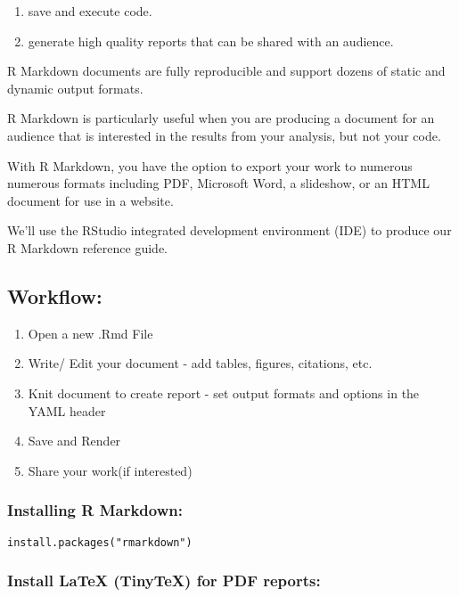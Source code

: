 \documentclass[
]{article}
\providecommand{\tightlist}{%
  \setlength{\itemsep}{0pt}\setlength{\parskip}{0pt}}
\begin{document}
\begin{enumerate}
\def\labelenumi{\arabic{enumi}.}
\tightlist
\item
  save and execute code.
\item
  generate high quality reports that can be shared with an audience.
\end{enumerate}

R Markdown documents are fully reproducible and support dozens of static
and dynamic output formats.

R Markdown is particularly useful when you are producing a document for
an audience that is interested in the results from your analysis, but
not your code.

With R Markdown, you have the option to export your work to numerous
numerous formats including PDF, Microsoft Word, a slideshow, or an HTML
document for use in a website.

We'll use the RStudio integrated development environment (IDE) to
produce our R Markdown reference guide.

\hypertarget{workflow}{%
\subsection{Workflow:}\label{workflow}}

\begin{enumerate}
\def\labelenumi{\arabic{enumi}.}
\tightlist
\item
  Open a new .Rmd File
\item
  Write/ Edit your document - add tables, figures, citations, etc.
\item
  Knit document to create report - set output formats and options in the
  YAML header
\item
  Save and Render
\item
  Share your work(if interested)
\end{enumerate}

\hypertarget{installing-r-markdown}{%
\subsubsection{Installing R Markdown:}\label{installing-r-markdown}}

\texttt{install.packages("rmarkdown")}

\hypertarget{install-latex-tinytex-for-pdf-reports}{%
\subsubsection{Install LaTeX (TinyTeX) for PDF
reports:}\label{install-latex-tinytex-for-pdf-reports}}
\end{document}
